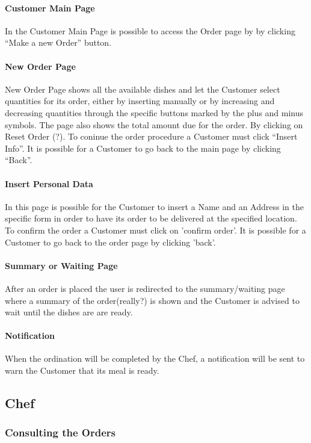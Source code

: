 \paragraph{Customer Main Page}
In the Customer Main Page is possible to access the Order page by by clicking ``Make a new Order'' button.

\paragraph{New Order Page}
New Order Page shows all the available dishes and let the Customer select quantities for its order, either by inserting manually or by increasing and decreasing quantities through the specific buttons marked by the plus and minus symbols. The page also shows the total amount due for the order.
By clicking on Reset Order (?).
To coninue the order procedure a Customer must click ``Insert Info''. 
It is possible for a Customer to go back to the main page by clicking ``Back''.

\paragraph{Insert Personal Data}
In this page is possible for the Customer to insert a Name and an Address in the specific form in order to have its order to be delivered at the specified location. To confirm the order a Customer must click on 'confirm order'. 
It is possible for a Customer to go back to the order page by clicking 'back'.

\paragraph{Summary or Waiting Page}
After an order is placed the user is redirected to the summary/waiting page where a summary of the order(really?) is shown and the Customer is advised to wait until the dishes are are ready.

\paragraph{Notification}
When the ordination will be completed by the Chef, a notification will be sent to warn the Customer that its meal is ready.

\subsection{Chef}
\subsubsection{Consulting the Orders}


